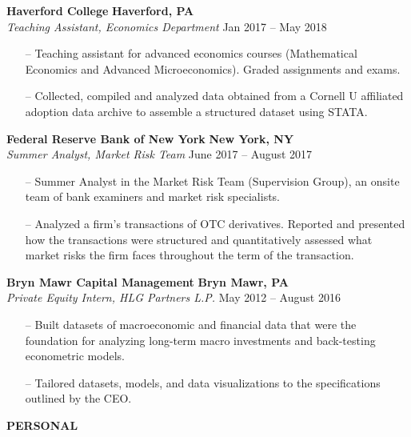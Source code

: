 \documentclass[paper=a4, fontsize=11pt]{scrartcl} %
\newcommand{\I}{--}
\newenvironment{mycenter}[1][\topsep]
  {\setlength{\topsep}{#1}\par\kern\topsep\centering}%
  {\par\kern\topsep}%
\begin{document}
\textbf{Haverford College} \hfill \textbf{Haverford, PA}\\
\textit{Teaching Assistant, Economics Department}
\hfill Jan 2017 -- May 2018
\begin{itemize}[topsep=0pt,noitemsep]
  \item[\I] Teaching assistant for advanced economics courses (Mathematical Economics and Advanced Microeconomics). Graded assignments and exams. 
  \item[\I] Collected, compiled and analyzed data obtained from a Cornell U affiliated adoption data
archive to assemble a structured dataset using STATA.
\end{itemize}

\vspace{1mm}

\textbf{Federal Reserve Bank of New York} \hfill \textbf{New York, NY} \\
\textit{Summer Analyst, Market Risk Team} \hfill June 2017 -- August 2017
\begin{itemize}[topsep=0pt,noitemsep]
	\item[\I] Summer Analyst in the Market Risk Team (Supervision Group), an onsite team of bank examiners and
market risk specialists. 
	\item[\I] Analyzed a firm's transactions of OTC derivatives. Reported and presented
how the transactions were structured and quantitatively assessed what market risks the firm faces throughout the term of the
transaction.
\end{itemize}

\textbf{Bryn Mawr Capital Management} \hfill \textbf{Bryn Mawr, PA} \\
\textit{Private Equity Intern, HLG Partners L.P.} \hfill May 2012 -- August 2016
\begin{itemize}[topsep=0pt,noitemsep]
	\item[\I] Built datasets of macroeconomic and financial data that were the foundation for
analyzing long-term macro investments and back-testing econometric models.
	\item[\I] Tailored datasets, models, and data visualizations to the specifications outlined by the CEO.

\end{itemize}

\vspace{2mm}

\begin{mycenter}[0pt]
\textsc{\textbf{PERSONAL}}
\end{mycenter}
\end{document}
